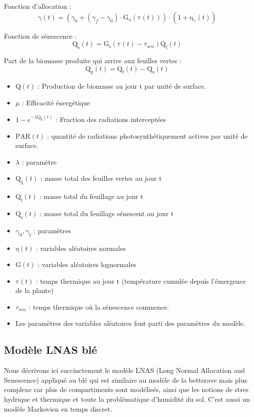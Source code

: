 Fonction d'allocation :
 \[ \mathrm{\gamma}(t) = (\gamma_0 + (\gamma_f - \gamma_0)\cdot\mathrm{G_a}(\mathrm{\tau}(t)))\cdot(1+\mathrm{\eta_{\gamma}}(t)) \]
 
Fonction de sénescence :
 \[ \mathrm{Q_s}(t) = \mathrm{G_s}(\mathrm{\tau}(t)- \tau_{sen})\mathrm{Q_f}(t) \]
 
Part de la biomasse produite qui arrive aux feuilles vertes :
 \[\mathrm{Q_g}(t) = \mathrm{Q_f}(t) - \mathrm{Q_s}(t) \]
 
 \begin{itemize}
 
 \item $\mathrm{Q}(t)$ : Production de biomasse au jour t par unité de surface.
 \item $\mu$ : Efficacité énergétique
 \item $1-e^{-\lambda\mathrm{Q_g}(t)}$ : Fraction des radiations interceptées
 \item $\mathrm{PAR}(t)$ : quantité de radiations photosynthétiquement actives par unité de surface.
 \item $\lambda$ : paramètre
 \item $\mathrm{Q_g}(t)$ : masse total des feuilles vertes au jour t
 \item $\mathrm{Q_f}(t)$ : masse total du feuillage au jour t
 \item $\mathrm{Q_s}(t)$ : masse total du feuillage sénescent au jour t 
 \item $\mathrm{\gamma_0}, \mathrm{\gamma_f}$ : paramètres
 \item $\mathrm{\eta}(t)$ : variables aléatoires normales 
 \item $\mathrm{G}(t)$ : variables aléatoires lognormales
 \item $\mathrm{\tau}(t)$ : temps thermique au jour t (température cumulée depuis l'émergence de la plante)
 \item $\tau_{sen}$ : temps thermique où la sénescence commence.
 \item Les paramètres des variables aléatoires font parti des paramètres du modèle.
 
 \end{itemize}
 
\subsection{Modèle LNAS blé}
Nous décrivons ici succinctement le modèle LNAS (Long Normal Allocation and Senescence) appliqué au blé qui est similaire au modèle de la betterave mais plus complexe car plus de compartiments sont modélisés, ainsi que les notions de stres hydrique et thermique et toute la problématique d'humidité du sol. 
C’est aussi un modèle Markovien en temps discret.

